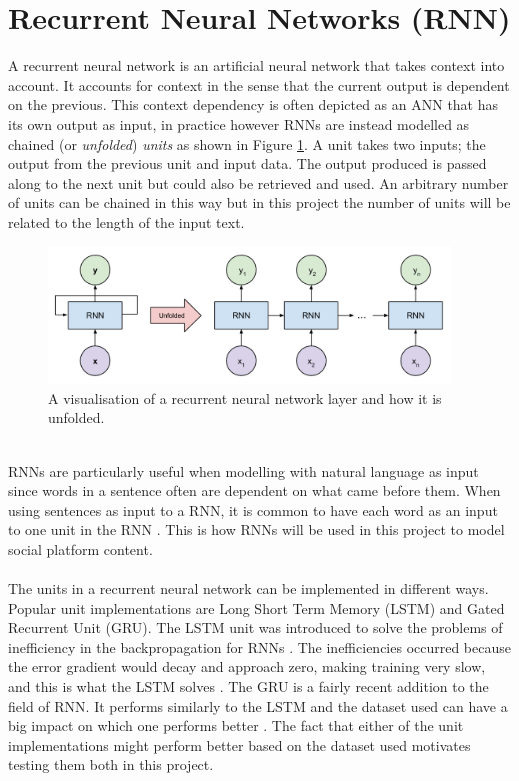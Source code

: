 \section{Recurrent Neural Networks (RNN)}
A recurrent neural network is an artificial neural network that takes context into account. It accounts for context in the sense that the current output is dependent on the previous. This context dependency is often depicted as an ANN that has its own output as input, in practice however RNNs are instead modelled as chained (or \textit{unfolded}) \textit{units} as shown in Figure \ref{fig:chained_units}. A unit takes two inputs; the output from the previous unit and input data. The output produced is passed along to the next unit but could also be retrieved and used. An arbitrary number of units can be chained in this way but in this project the number of units will be related to the length of the input text. 
\begin{figure}[h]
    \centering
    \includegraphics[width=0.95\textwidth]{figure/ann/rnn_unfold}
    \caption{A visualisation of a recurrent neural network layer and how it is unfolded.}
    \label{fig:chained_units}
\end{figure}
\\
RNNs are particularly useful when modelling with natural language as input since words in a sentence often are dependent on what came before them. When using sentences as input to a RNN, it is common to have each word as an input to one unit in the RNN \parencite{palangi2016deep}. This is how RNNs will be used in this project to model social platform content.
\\\\
The units in a recurrent neural network can be implemented in different ways. Popular unit implementations are Long Short Term Memory (LSTM) and Gated Recurrent Unit (GRU). The LSTM unit was introduced to solve the problems of inefficiency in the backpropagation for RNNs \parencite{LSTMdefined}. The inefficiencies occurred because the error gradient would decay and approach zero, making training very slow, and this is what the LSTM solves \parencite{hochreiter1998vanishing}. The GRU is a fairly recent addition to the field of RNN. It performs similarly to the LSTM and the dataset used can have a big impact on which one performs better \parencite{GRUchung2014empirical}. The fact that either of the unit implementations might perform better based on the dataset used motivates testing them both in this project.

